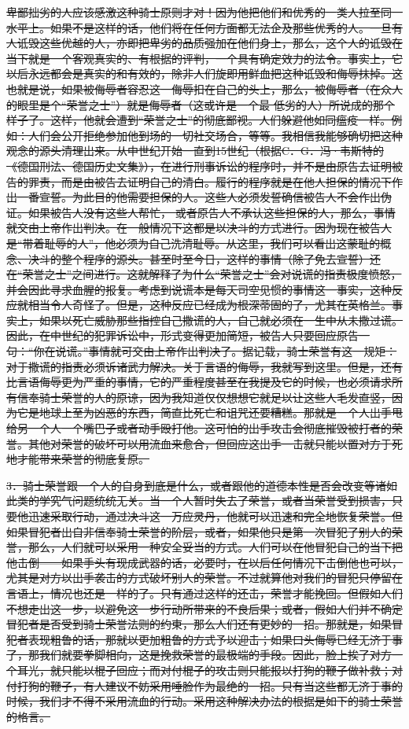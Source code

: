 \documentclass[12pt,oneside]{book}
\begin{document}
\sout{卑鄙拙劣的人应该感激这种骑士原则才对！因为他把他们和优秀的一类人拉至同一水平上。如果不是这样的话，他们将在任何方面都无法企及那些优秀的人。一旦有人诋毁这些优越的人，亦即把卑劣的品质强加在他们身上，那么，这个人的诋毁在当下就是一个客观真实的、有根据的评判，一个具有确定效力的法令。事实上，它以后永远都会是真实的和有效的，除非人们旋即用鲜血把这种诋毁和侮辱抹掉。这也就是说，如果被侮辱者容忍这一侮辱扣在自己的头上，那么，被侮辱者（在众人的眼里是个“荣誉之士”）就是侮辱者（这或许是一个最
低劣的人）所说成的那个样子了。这样，他就会遭到“荣誉之士”的彻底鄙视。人们躲避他如同瘟疫一样。例如：人们会公开拒绝参加他到场的一切社交场合，等等。我相信我能够确切把这种观念的源头清理出来。从中世纪开始一直到15世纪（根据C．G．冯·韦斯特的《德国刑法、德国历史文集》），在进行刑事诉讼的程序时，并不是由原告去证明被告的罪责，而是由被告去证明自己的清白。履行的程序就是在他人担保的情况下作出一番宣誓。为此目的他需要担保的人。这些人必须发誓确信被告人不会作出伪证。如果被告人没有这些人帮忙，
或者原告人不承认这些担保的人，那么，事情就交由上帝作出判决。在一般情况下这都是以决斗的方式进行。因为现在被告人是“带着耻辱的人”，他必须为自己洗清耻辱。从这里，我们可以看出这蒙耻的概念、决斗的整个程序的源头。甚至时至今日，这样的事情（除了免去宣誓）还在“荣誉之士”之间进行。这就解释了为什么“荣誉之士”会对说谎的指责极度愤怒，并会因此寻求血腥的报复。考虑到说谎本是每天司空见惯的事情这一事实，这种反应就相当令人奇怪了。但是，这种反应已经成为根深蒂固的了，尤其在英格兰。事实上，如果以死亡威胁那些指控自己撒谎的人，自己就必须在一生中从未撒过谎。因此，在中世纪的犯罪诉讼中，形式变得更加简短，被告人只要回应原告一句：“你在说谎。”事情就可交由上帝作出判决了。据记载，骑士荣誉有这一规矩：对于撒谎的指责必须诉诸武力解决。关于言语的侮辱，我就写到这里。但是，还有比言语侮辱更为严重的事情，它的严重程度甚至在我提及它的时候，也必须请求所有信奉骑士荣誉的人的原谅，因为我知道仅仅想想它就足以让这些人毛发直竖，因为它是地球上至为凶恶的东西，简直比死亡和诅咒还要糟糕。那就是一个人出手甩给另一个人一个嘴巴子或者动手殴打他。这可怕的出手攻击会彻底摧毁被打者的荣誉。其他对荣誉的破坏可以用流血来愈合，但回应这出手一击就只能以置对方于死地才能带来荣誉的彻底复原。} 

\sout{3．骑士荣誉跟一个人的自身到底是什么，或者跟他的道德本性是否会改变等诸如此类的学究气问题统统无关。当一个人暂时失去了荣誉，或者当荣誉受到损害，只要他迅速采取行动，通过决斗这一万应灵丹，他就可以迅速和完全地恢复荣誉。但如果冒犯者出自非信奉骑士荣誉的阶层，或者，如果他只是第一次冒犯了别人的荣誉，那么，人们就可以采用一种安全妥当的方式。人们可以在他冒犯自己的当下把他击倒——如果手头有现成武器的话，必要时，在以后任何情况下击倒他也可以，尤其是对方以出手袭击的方式破坏别人的荣誉。不过就算他对我们的冒犯只停留在言语上，情况也还是一样的了。只有通过这样的还击，荣誉才能挽回。但假如人们不想走出这一步，以避免这一步行动所带来的不良后果；或者，假如人们并不确定冒犯者是否受到骑士荣誉法则的约束，那么人们还有更妙的一招。那就是，如果冒犯者表现粗鲁的话，那就以更加粗鲁的方式予以迎击；如果口头侮辱已经无济于事了，那我们就要拳脚相向，这是挽救荣誉的最极端的手段。因此，脸上挨了对方一个耳光，就只能以棍子回应；而对付棍子的攻击则只能报以打狗的鞭子做补救；对付打狗的鞭子，有人建议不妨采用唾脸作为最绝的一招。只有当这些都无济于事的时候，我们才不得不采用流血的行动。采用这种解决办法的根据是如下的骑士荣誉的格言。 }
\end{document}
